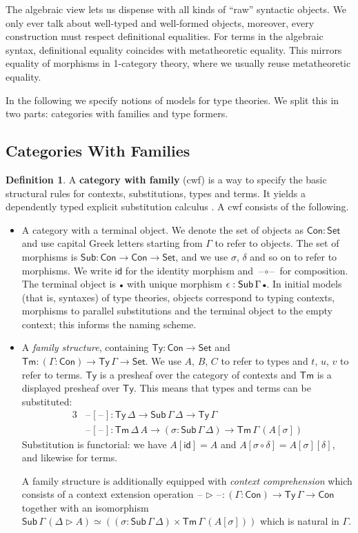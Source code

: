 \documentclass[12pt,a4paper,twoside,openany]{book}
\theoremstyle{remark}
\theoremstyle{definition}
\newtheorem{mydefinition}{Definition}
\newcommand{\id}{\mathsf{id}}
\newcommand{\Con}{\mathsf{Con}}
\newcommand{\Sub}{\mathsf{Sub}}
\newcommand{\Tm}{\mathsf{Tm}}
\newcommand{\Ty}{\mathsf{Ty}}
\newcommand{\blank}{\mathord{\hspace{1pt}\text{--}\hspace{1pt}}}
\newcommand{\Set}{\mathsf{Set}}
\newcommand{\ext}{\triangleright}
\newcommand{\emptycon}{\scaleobj{.75}\bullet}
\begin{document}
The algebraic view lets us dispense with all kinds of ``raw'' syntactic objects.
We only ever talk about well-typed and well-formed objects, moreover, every
construction must respect definitional equalities. For terms in the algebraic
syntax, definitional equality coincides with metatheoretic equality. This
mirrors equality of morphisms in 1-category theory, where we usually reuse
metatheoretic equality.

In the following we specify notions of models for type theories. We split this
in two parts: categories with families and type formers.

\subsection{Categories With Families}

\begin{mydefinition}
A \textbf{category with family} (cwf) \cite{Dybjer96internaltype} is a way to
specify the basic structural rules for contexts, substitutions, types and
terms. It yields a dependently typed explicit substitution calculus \cite{TODO}.
A cwf consists of the following.
\begin{itemize}
\item
  A category with a terminal object. We denote the set of objects as $\Con :
  \Set$ and use capital Greek letters starting from $\Gamma$ to refer to
  objects. The set of morphisms is $\Sub : \Con \to \Con \to \Set$, and we use
  $\sigma$, $\delta$ and so on to refer to morphisms. We write $\id$ for the
  identity morphism and $\blank\circ\blank$ for composition. The terminal
  object is $\emptycon$ with unique morphism $\epsilon :
  \Sub\,\Gamma\,\emptycon$. In initial models (that is, syntaxes) of type
  theories, objects correspond to typing contexts, morphisms to parallel
  substitutions and the terminal object to the empty context; this informs the
  naming scheme.
\item A \emph{family structure}, containing $\Ty : \Con \to \Set$ and $\Tm :
  (\Gamma : \Con) \to \Ty\,\Gamma \to \Set$. We use $A$, $B$, $C$ to refer to
  types and $t$, $u$, $v$ to refer to terms. $\Ty$ is a presheaf over the
  category of contexts and $\Tm$ is a displayed presheaf over $\Ty$. This means
  that types and terms can be substituted:
  \begin{alignat*}{3}
    &\blank[\blank] : \Ty\,\Delta \to \Sub\,\Gamma\,\Delta \to \Ty\,\Gamma\\
    &\blank[\blank] : \Tm\,\Delta\,A \to (\sigma : \Sub\,\Gamma\,\Delta) \to \Tm\,\Gamma\,(A[\sigma])
  \end{alignat*}
  Substitution is functorial: we have $A[\id] = A$ and
  $A[\sigma\circ\delta] = A[\sigma][\delta]$, and likewise for terms.

  A family structure is additionally equipped with \emph{context comprehension}
  which consists of a context extension operation $\blank\ext\blank : (\Gamma :
  \Con) \to \Ty\,\Gamma \to \Con$ together with an isomorphism
  $\Sub\,\Gamma\,(\Delta\ext A) \simeq ((\sigma : \Sub\,\Gamma\,\Delta) \times
  \Tm\,\Gamma\,(A[\sigma]))$ which is natural in $\Gamma$.
\end{itemize}
\end{mydefinition}
\end{document}
